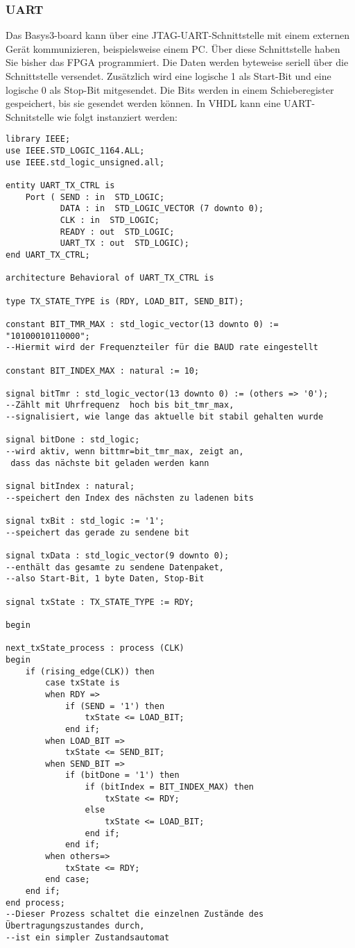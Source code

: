 \documentclass{article}
\begin{document}
\subsubsection{UART}
Das Basys3-board kann \"uber eine JTAG-UART-Schnittstelle mit einem externen Ger\"at kommunizieren, beispielsweise einem PC. \"Uber diese Schnittstelle haben Sie bisher das FPGA programmiert. Die Daten werden byteweise seriell \"uber die Schnittstelle versendet. Zus\"atzlich wird eine logische 1 als Start-Bit und eine logische 0 als Stop-Bit mitgesendet. Die Bits werden in einem Schieberegister gespeichert, bis sie gesendet werden k\"onnen. In VHDL kann eine UART-Schnitstelle wie folgt instanziert werden:\newline
\begin{verbatim}
library IEEE;
use IEEE.STD_LOGIC_1164.ALL;
use IEEE.std_logic_unsigned.all;

entity UART_TX_CTRL is
    Port ( SEND : in  STD_LOGIC;
           DATA : in  STD_LOGIC_VECTOR (7 downto 0);
           CLK : in  STD_LOGIC;
           READY : out  STD_LOGIC;
           UART_TX : out  STD_LOGIC);
end UART_TX_CTRL;

architecture Behavioral of UART_TX_CTRL is

type TX_STATE_TYPE is (RDY, LOAD_BIT, SEND_BIT);

constant BIT_TMR_MAX : std_logic_vector(13 downto 0) := "10100010110000";
--Hiermit wird der Frequenzteiler für die BAUD rate eingestellt

constant BIT_INDEX_MAX : natural := 10;

signal bitTmr : std_logic_vector(13 downto 0) := (others => '0');
--Zählt mit Uhrfrequenz  hoch bis bit_tmr_max,
--signalisiert, wie lange das aktuelle bit stabil gehalten wurde

signal bitDone : std_logic;
--wird aktiv, wenn bittmr=bit_tmr_max, zeigt an,
 dass das nächste bit geladen werden kann

signal bitIndex : natural;
--speichert den Index des nächsten zu ladenen bits

signal txBit : std_logic := '1';
--speichert das gerade zu sendene bit

signal txData : std_logic_vector(9 downto 0);
--enthält das gesamte zu sendene Datenpaket,
--also Start-Bit, 1 byte Daten, Stop-Bit

signal txState : TX_STATE_TYPE := RDY;

begin

next_txState_process : process (CLK)
begin
	if (rising_edge(CLK)) then
		case txState is 
		when RDY =>
			if (SEND = '1') then
				txState <= LOAD_BIT;
			end if;
		when LOAD_BIT =>
			txState <= SEND_BIT;
		when SEND_BIT =>
			if (bitDone = '1') then
				if (bitIndex = BIT_INDEX_MAX) then
					txState <= RDY;
				else
					txState <= LOAD_BIT;
				end if;
			end if;
		when others=>
			txState <= RDY;
		end case;
	end if;
end process;
--Dieser Prozess schaltet die einzelnen Zustände des Übertragungszustandes durch,
--ist ein simpler Zustandsautomat


\end{verbatim}
\end{document}
